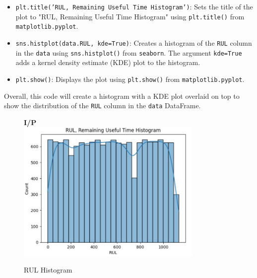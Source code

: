 \begin{itemize}
    \item \texttt{plt.title('RUL, Remaining Useful Time Histogram')}: Sets the title of the plot to "RUL, Remaining Useful Time Histogram" using \texttt{plt.title()} from \texttt{matplotlib.pyplot}.
    \item \texttt{sns.histplot(data.RUL, kde=True)}: Creates a histogram of the \texttt{RUL} column in the \texttt{data} using \texttt{sns.histplot()} from \texttt{seaborn}. The argument \texttt{kde=True} adds a kernel density estimate (KDE) plot to the histogram.
    \item \texttt{plt.show()}: Displays the plot using \texttt{plt.show()} from \texttt{matplotlib.pyplot}.
\end{itemize}
Overall, this code will create a histogram with a KDE plot overlaid on top to show the distribution of the \texttt{RUL} column in the \texttt{data} DataFrame.
\begin{figure}[H]
    \centering
    \textbf{I/P} \\[-2.5em]
    \includegraphics[width=0.8\textwidth]{rul_histogram.jpg}
    \caption{RUL Histogram}
    \label{fig:rul_histogram}
\end{figure}

